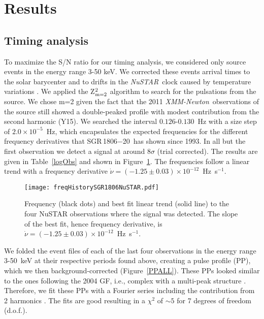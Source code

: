 \documentclass[twocolumn]{aastex6}
\newcommand {\xmm} {\textsl{XMM-Newton}}
\newcommand {\nustar} {\textsl{NuSTAR}}
\def \src {SGR\,1806$-$20}
\begin{document}
\newpage

\section{Results}
\label{res}

\subsection{Timing analysis}
\label{timeana}

To maximize the S/N ratio for our timing analysis, we considered only
source events in the energy range 3-50 keV. We corrected these events 
arrival times to the solar barycenter and to drifts in the \nustar\
clock caused by temperature variations \citep{harrison13ApJ:NuSTAR}.
We applied the Z$^2_{\rm m=2}$ algorithm to search for the pulsations
from the source. We chose m=2 given the fact that the 2011 \xmm\
observations of the source still showed a double-peaked profile with
modest contribution from the second harmonic (Y15). We searched the
interval $0.126$-$0.130$~Hz with a size step of $2.0\times10^{-5}$~Hz,
which encapsulates the expected frequencies for the different
frequency derivatives that \src\ has shown since 1993. In all but the
first observation we detect a signal at around $8\sigma$ (trial
corrected). The results are given in Table~\ref{logObs} and shown in
Figure~\ref{freqHisNus}. The frequencies follow a linear trend
with a frequency derivative
$\dot{\nu}=(-1.25\pm0.03)\times10^{-12}$~Hz~s$^{-1}$. 

\begin{figure}[]
\begin{center}
\texttt{[image: freqHistorySGR1806NuSTAR.pdf]}
\caption{Frequency (black dots) and best fit linear trend (solid line)
  to the four NuSTAR observations where the signal was detected. The
  slope of the best fit, hence frequency derivative, is
  $\dot{\nu}=(-1.25\pm0.03)\times10^{-12}$~Hz~s$^{-1}$.}
\label{freqHisNus}
\end{center}
\end{figure}

We folded the event files of each of the last four observations
in the energy range 3-50~keV at their respective periods found
above, creating a pulse profile (PP), which we then
background-corrected (Figure~\ref{PPALL}). These PPs looked similar to
the ones following the 2004 GF, i.e., complex with a multi-peak
structure \citep[e.g., ][Y15]{mereghetti05ApJ:1806,woods07ApJ:1806}.
Therefore, we fit these PPs with a Fourier series including the
contribution from 2 harmonics \citep[e.g.,][Figure~\ref{PPALL}]{
  bildsten97ApJ:PP,younes15ApJ:1744}. The fits are good resulting in a
$\chi^2$ of $\sim5$ for 7 degrees of freedom (d.o.f.).
\end{document}
